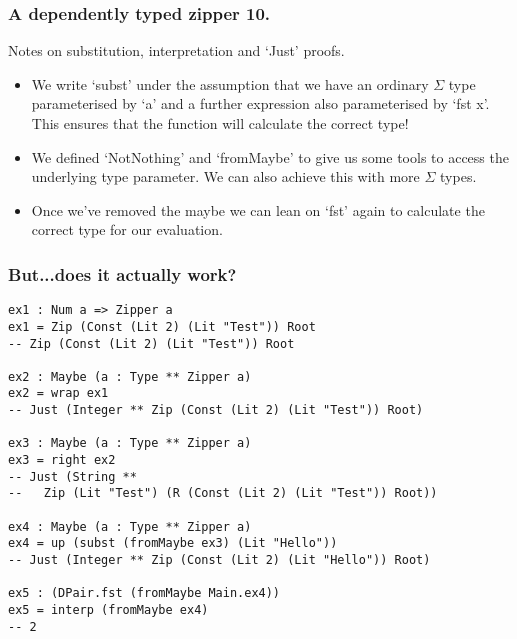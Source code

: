 \documentclass{beamer}
\begin{document}
\begin{frame}[fragile]
  \frametitle{A dependently typed zipper 10.}
  \begin{block}{Notes on substitution, interpretation and `Just' proofs.}
    \begin{itemize}
      \item We write `subst' under the assumption that we have an ordinary
        $\Sigma$ type parameterised by `a' and a further expression also
        parameterised by `fst x'. This ensures that the function will calculate
        the correct type!
      \item We defined `NotNothing' and `fromMaybe' to give us some tools
        to access the underlying type parameter. We can also achieve this
        with more $\Sigma$ types.
      \item Once we've removed the maybe we can lean on `fst' again to
        calculate the correct type for our evaluation.
    \end{itemize}
  \end{block}
\end{frame}

\begin{frame}[fragile]
  \frametitle{But...does it actually work?}
  \begin{verbatim}
ex1 : Num a => Zipper a
ex1 = Zip (Const (Lit 2) (Lit "Test")) Root
-- Zip (Const (Lit 2) (Lit "Test")) Root

ex2 : Maybe (a : Type ** Zipper a)
ex2 = wrap ex1
-- Just (Integer ** Zip (Const (Lit 2) (Lit "Test")) Root)

ex3 : Maybe (a : Type ** Zipper a)
ex3 = right ex2
-- Just (String ** 
--   Zip (Lit "Test") (R (Const (Lit 2) (Lit "Test")) Root))

ex4 : Maybe (a : Type ** Zipper a)
ex4 = up (subst (fromMaybe ex3) (Lit "Hello"))
-- Just (Integer ** Zip (Const (Lit 2) (Lit "Hello")) Root)

ex5 : (DPair.fst (fromMaybe Main.ex4))
ex5 = interp (fromMaybe ex4)
-- 2
  \end{verbatim}
\end{frame}
\end{document}
